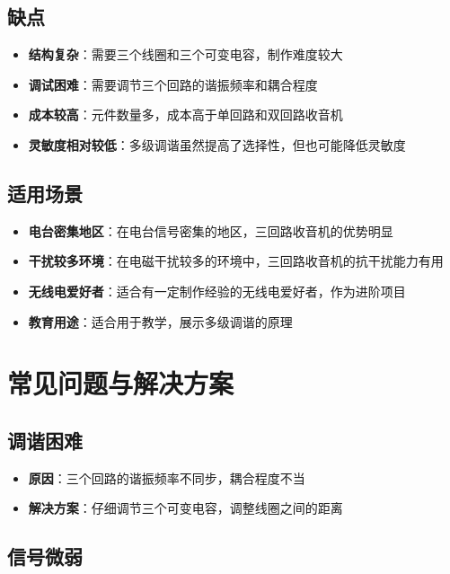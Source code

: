 \documentclass[12pt,UTF8]{ctexbook}
\begin{document}
\subsection{缺点}

\begin{itemize}[leftmargin=3.5em]
    \item \textbf{结构复杂}：需要三个线圈和三个可变电容，制作难度较大
    \item \textbf{调试困难}：需要调节三个回路的谐振频率和耦合程度
    \item \textbf{成本较高}：元件数量多，成本高于单回路和双回路收音机
    \item \textbf{灵敏度相对较低}：多级调谐虽然提高了选择性，但也可能降低灵敏度
\end{itemize}

\subsection{适用场景}

\begin{itemize}[leftmargin=3.5em]
    \item \textbf{电台密集地区}：在电台信号密集的地区，三回路收音机的优势明显
    \item \textbf{干扰较多环境}：在电磁干扰较多的环境中，三回路收音机的抗干扰能力有用
    \item \textbf{无线电爱好者}：适合有一定制作经验的无线电爱好者，作为进阶项目
    \item \textbf{教育用途}：适合用于教学，展示多级调谐的原理
\end{itemize}

\section{常见问题与解决方案}

\subsection{调谐困难}

\begin{itemize}[leftmargin=3.5em]
    \item \textbf{原因}：三个回路的谐振频率不同步，耦合程度不当
    \item \textbf{解决方案}：仔细调节三个可变电容，调整线圈之间的距离
\end{itemize}

\subsection{信号微弱}
\end{document}
